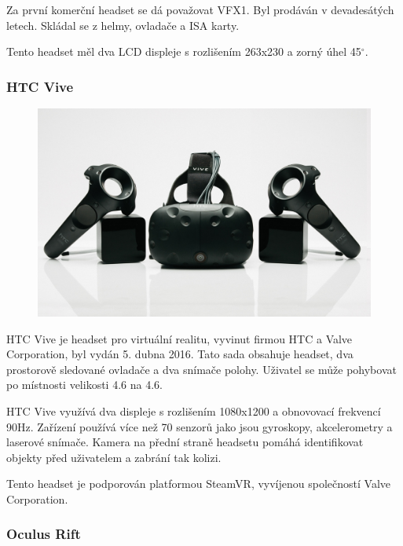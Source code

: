 Za první komerční headset se dá považovat VFX1. Byl prodáván v devadesátých letech. Skládal se z helmy, ovladače a ISA karty.

Tento headset měl dva LCD displeje s rozlišením 263x230 a zorný úhel 45$ ^{\circ} $.\cite{vfx1}

\subsubsection{HTC Vive}

\begin{figure}
	\centering
	\includegraphics[keepaspectratio,width=\textwidth]{obrazky/vive}
\end{figure}

HTC Vive je headset pro virtuální realitu, vyvinut firmou HTC a Valve Corporation, byl vydán 5. dubna 2016. Tato sada obsahuje headset, dva prostorově sledované ovladače a dva snímače polohy. Uživatel se může pohybovat po místnosti velikosti 4.6 na 4.6.\cite{vive_bbc}


HTC Vive využívá dva displeje s rozlišením 1080x1200\cite{vive_gamespot} a obnovovací frekvencí 90Hz. Zařízení používá více než 70 senzorů jako jsou gyroskopy, akcelerometry a laserové snímače.\cite{vive_bbc}\cite{vive-lasery} Kamera na přední straně headsetu pomáhá identifikovat objekty před uživatelem a zabrání tak kolizi.

Tento headset je podporován platformou SteamVR, vyvíjenou společností Valve Corporation.

\subsubsection{Oculus Rift}

